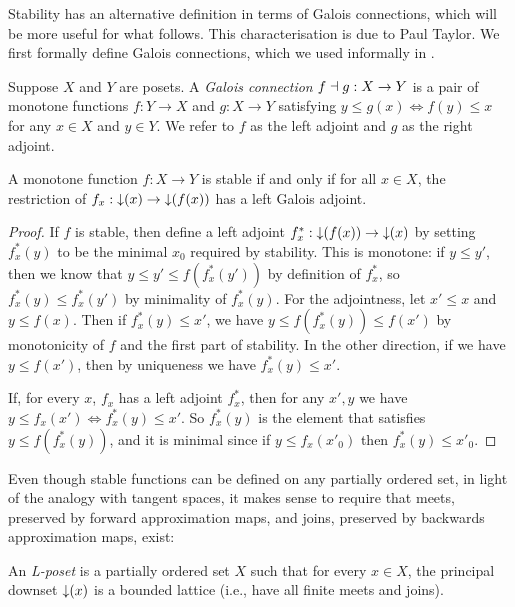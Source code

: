 Stability has an alternative definition in terms of Galois connections, which will be more useful for what follows. This characterisation is due to Paul Taylor. We first formally define Galois connections, which we used informally in .

\begin{definition}
  \label{def:galois-connection}
  Suppose $X$ and $Y$ are posets. A \emph{Galois connection} $f \dashv g: X \to Y$ is a pair of monotone functions $f: Y \to X$ and $g: X \to Y$ satisfying $y \leq g(x) \iff f(y) \leq x$ for any $x \in X$ and $y \in Y$. We refer to $f$ as the left adjoint and $g$ as the right adjoint.
\end{definition}

\begin{lemma}
  A monotone function $f : X \to Y$ is stable if and only if for all $x \in X$, the restriction of $f_x : \mathop{\downarrow}(x) \to \mathop{\downarrow}(f(x))$ has a left Galois adjoint.
\end{lemma}

\begin{proof}
  If $f$ is stable, then define a left adjoint
  $f^*_x : \mathop{\downarrow}(f(x)) \to \mathop{\downarrow}(x)$ by setting $f^*_x(y)$ to be
  the minimal $x_0$ required by stability. This is monotone: if
  $y \leq y'$, then we know that $y \leq y' \leq f(f^*_x(y'))$ by
  definition of $f^*_x$, so $f^*_x(y) \leq f^*_x(y')$ by minimality of
  $f^*_x(y)$. For the adjointness, let $x' \leq x$ and $y \leq
  f(x)$. Then if $f^*_x(y) \leq x'$, we have
  $y \leq f(f^*_x(y)) \leq f(x')$ by monotonicity of $f$ and the first
  part of stability. In the other direction, if we have
  $y \leq f(x')$, then by uniqueness we have $f^*_x(y) \leq x'$.

  If, for every $x$, $f_x$ has a left adjoint $f^*_x$, then for any
  $x', y$ we have $y \leq f_x(x') \Leftrightarrow f^*_x(y) \leq
  x'$. So $f^*_x(y)$ is the element that satisfies
  $y \leq f(f^*_x(y))$, and it is minimal since if $y \leq f_x(x'_0)$
  then $f^*_x(y) \leq x'_0$.
\end{proof}

Even though stable functions can be defined on any partially ordered set, in light of the analogy with tangent spaces, it makes sense to require that meets, preserved by forward approximation maps, and joins, preserved by backwards approximation maps, exist:

\begin{definition}
  An \emph{L-poset} is a partially ordered set $X$ such that for every $x \in X$, the principal downset $\mathop{\downarrow}(x)$ is a bounded lattice (i.e., have all finite meets and joins).
\end{definition}

